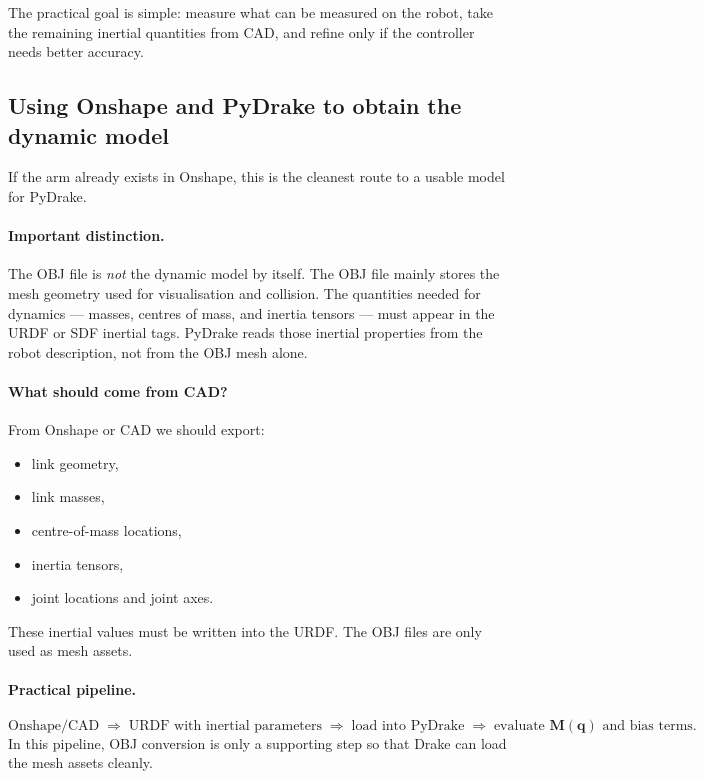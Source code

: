 \documentclass[11pt,a4paper]{article}
\newcommand{\vq}{\bm{q}}
\newcommand{\M}{\bm{M}}
\begin{document}
\begin{resultbox}
The practical goal is simple: measure what can be measured on the robot, take
the remaining inertial quantities from CAD, and refine only if the controller
needs better accuracy.
\end{resultbox}

\subsection{Using Onshape and PyDrake to obtain the dynamic model}

If the arm already exists in Onshape, this is the cleanest route to a usable
model for PyDrake.

\paragraph{Important distinction.}
The OBJ file is \emph{not} the dynamic model by itself.  The OBJ file mainly
stores the mesh geometry used for visualisation and collision.  The quantities
needed for dynamics --- masses, centres of mass, and inertia tensors --- must
appear in the URDF or SDF inertial tags.  PyDrake reads those inertial
properties from the robot description, not from the OBJ mesh alone.

\paragraph{What should come from CAD?}
From Onshape or CAD we should export:
\begin{itemize}[leftmargin=2em]
  \item link geometry,
  \item link masses,
  \item centre-of-mass locations,
  \item inertia tensors,
  \item joint locations and joint axes.
\end{itemize}
These inertial values must be written into the URDF.  The OBJ files are only
used as mesh assets.

\paragraph{Practical pipeline.}
\begin{equation}
  \text{Onshape/CAD}
  \;\Longrightarrow\;
  \text{URDF with inertial parameters}
  \;\Longrightarrow\;
  \text{load into PyDrake}
  \;\Longrightarrow\;
  \text{evaluate } \M(\vq)\text{ and bias terms}.
\end{equation}
In this pipeline, OBJ conversion is only a supporting step so that Drake can
load the mesh assets cleanly.
\end{document}

